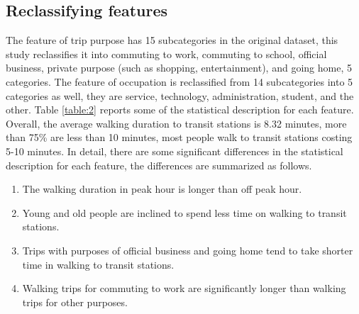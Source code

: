 \documentclass[Journal,letterpaper]{ascelike-new}
\begin{document}
%
\subsection{Reclassifying features}
The feature of trip purpose has 15 subcategories in the original dataset, this study reclassifies it into commuting to work, commuting to school, official business, private purpose (such as shopping, entertainment), and going home, 5 categories. The feature of occupation is reclassified from 14 subcategories into 5 categories as well, they are service, technology, administration, student, and the other. Table \ref{table:2} reports some of the statistical description for each feature. Overall, the average walking duration to transit stations is 8.32 minutes, more than 75\% are less than 10 minutes, most people walk to transit stations costing 5-10 minutes. In detail, there are some significant differences in the statistical description for each feature, the differences are summarized as follows.

%
\begin{enumerate}
    \item The walking duration in peak hour is longer than off peak hour.
    \item Young and old people are inclined to spend less time on walking to transit stations.
    \item Trips with purposes of official business and going home tend to take shorter time in walking to transit stations.
    \item Walking trips for commuting to work are significantly longer than walking trips for other purposes.
\end{enumerate}

%
\end{document}
